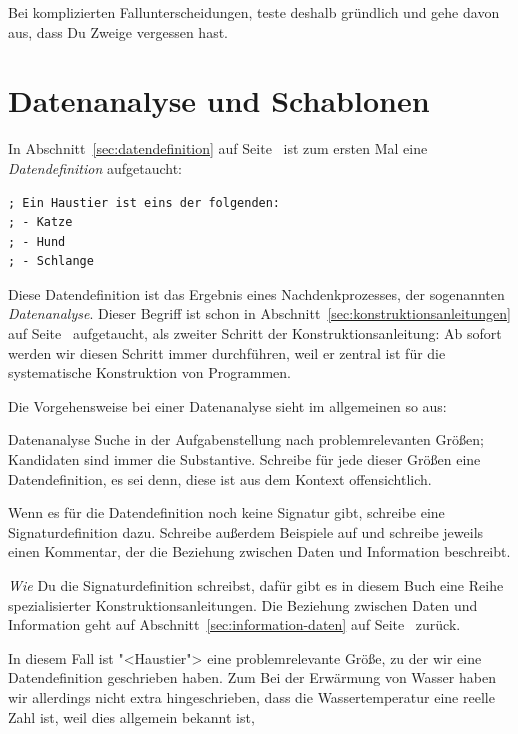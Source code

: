 \mantrakomplexitaet*

\noindent Bei komplizierten Fallunterscheidungen, teste deshalb gründlich und
gehe davon aus, dass Du Zweige vergessen hast.

\section{Datenanalyse und Schablonen}
\label{sec:datenanalyse}

In Abschnitt~\ref{sec:datendefinition} auf
Seite~\pageref{sec:datendefinition} ist zum ersten Mal eine
\textit{Datendefinition} aufgetaucht:
%
\begin{verbatim}
; Ein Haustier ist eins der folgenden:
; - Katze
; - Hund
; - Schlange
\end{verbatim}
%
Diese Datendefinition ist das Ergebnis eines Nachdenkprozesses, der
sogenannten \textit{Datenanalyse}.  Dieser Begriff
ist schon in Abschnitt~\ref{sec:konstruktionsanleitungen} auf
Seite~\pageref{sec:konstruktionsanleitungen} aufgetaucht, als zweiter
Schritt der Konstruktionsanleitung: Ab sofort werden wir diesen
Schritt immer durchführen, weil er zentral ist für die systematische
Konstruktion von Programmen.

Die Vorgehensweise bei einer Datenanalyse sieht im allgemeinen so aus:
%
\begin{konstruktionsanleitung}{Datenanalyse}
  Suche in der Aufgabenstellung nach problemrelevanten Größen;
  Kandidaten sind immer die Substantive. Schreibe für jede dieser
  Größen eine Datendefinition, es sei denn, diese ist aus dem Kontext
  offensichtlich.

  Wenn es für die Datendefinition noch keine Signatur gibt, schreibe
  eine Signaturdefinition dazu.  Schreibe außerdem Beispiele auf und
  schreibe jeweils einen Kommentar, der die Beziehung zwischen Daten
  und Information beschreibt.
\end{konstruktionsanleitung}
%
\emph{Wie} Du die Signaturdefinition schreibst, dafür gibt es in
diesem Buch eine Reihe spezialisierter Konstruktionsanleitungen.  Die
Beziehung zwischen Daten und Information geht auf
Abschnitt~\ref{sec:information-daten} auf
Seite~\pageref{sec:information-daten} zurück.

In diesem Fall ist "<Haustier"> eine problemrelevante Größe, zu der
wir eine Datendefinition geschrieben haben.  Zum Bei der Erwärmung von
Wasser haben wir allerdings nicht extra hingeschrieben, dass die
Wassertemperatur eine reelle Zahl ist, weil dies allgemein bekannt
ist,

